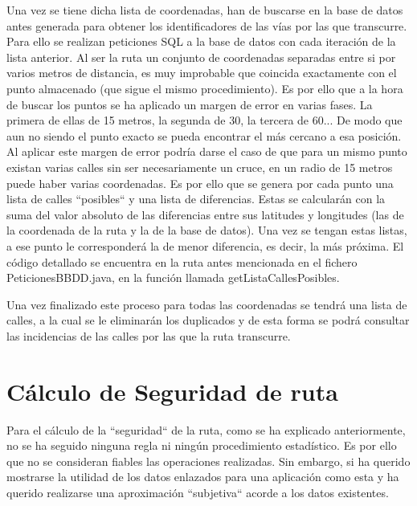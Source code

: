 Una vez se tiene dicha lista de coordenadas, han de buscarse en la base de datos antes generada para obtener los identificadores de las vías por las que transcurre. Para ello se realizan peticiones SQL  a la base de datos con cada iteración de la lista anterior.
Al ser la ruta un conjunto de coordenadas separadas entre si por varios metros de distancia, es muy improbable que coincida exactamente con el punto almacenado (que sigue el mismo procedimiento). Es por ello que a la hora de buscar los puntos se ha aplicado un margen de error en varias fases. La primera de ellas de 15 metros, la segunda de 30, la tercera de 60... De modo que aun no siendo el punto exacto se pueda encontrar el más cercano a esa posición.
Al aplicar este margen de error podría darse el caso de que para un mismo punto existan varias calles sin ser necesariamente un cruce, en un radio de 15 metros puede haber varias coordenadas. Es por ello que se genera por cada punto una lista de calles ``posibles`` y una lista de diferencias. Estas se calcularán con la suma del valor absoluto de las diferencias entre sus latitudes y longitudes (las de la coordenada de la ruta y la de la base de datos). Una vez se tengan estas listas, a ese punto le corresponderá la de menor diferencia, es decir, la más próxima.
El código detallado se encuentra en la ruta antes mencionada en el fichero PeticionesBBDD.java, en la función llamada getListaCallesPosibles.

Una vez finalizado este proceso para todas las coordenadas se tendrá una lista de calles, a la cual se le eliminarán los duplicados y de esta forma se podrá consultar las incidencias de las calles por las que la ruta transcurre.















\clearpage
\section{Cálculo de Seguridad de ruta}

Para el cálculo de la ``seguridad`` de la ruta, como se ha explicado anteriormente, no se ha seguido ninguna regla ni ningún procedimiento estadístico. Es por ello que no se consideran fiables las operaciones realizadas.
Sin embargo, si ha querido mostrarse la utilidad de los datos enlazados para una aplicación como esta y ha querido realizarse una aproximación ``subjetiva`` acorde a los datos existentes.

